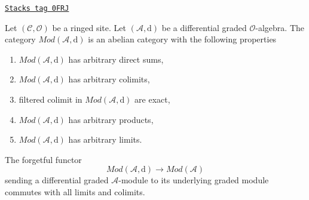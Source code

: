 \begin{lemma}
\label{sdga-lemma-dgm-abelian}
\href{https://stacks.math.columbia.edu/tag/0FRJ}{\texttt{Stacks tag 0FRJ}}

Let $(\mathcal{C}, \mathcal{O})$ be a ringed site.
Let $(\mathcal{A}, \text{d})$ be a differential graded $\mathcal{O}$-algebra.
The category $\textit{Mod}(\mathcal{A}, \text{d})$ is an abelian category
with the following properties
\begin{enumerate}
\item $\textit{Mod}(\mathcal{A}, \text{d})$ has arbitrary direct sums,
\item $\textit{Mod}(\mathcal{A}, \text{d})$ has arbitrary colimits,
\item filtered colimit in $\textit{Mod}(\mathcal{A}, \text{d})$ are exact,
\item $\textit{Mod}(\mathcal{A}, \text{d})$ has arbitrary products,
\item $\textit{Mod}(\mathcal{A}, \text{d})$ has arbitrary limits.
\end{enumerate}
The forgetful functor
$$
\textit{Mod}(\mathcal{A}, \text{d})
\longrightarrow
\textit{Mod}(\mathcal{A})
$$
sending a differential graded $\mathcal{A}$-module to its underlying
graded module commutes with all limits and colimits.
\end{lemma}

